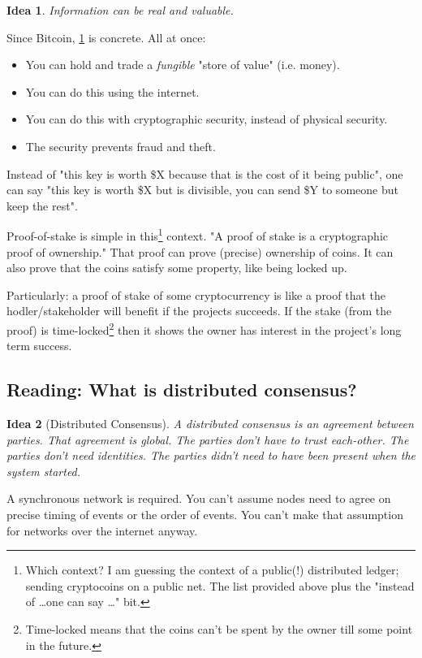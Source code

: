 \documentclass{article}
\newtheorem{idea}{Idea}
\begin{document}
\begin{idea} \label{def:inforeal}
    Information can be real and valuable.
\end{idea}

Since Bitcoin, \cref{def:inforeal} is concrete.
All at once:
\begin{itemize}
    \item You can hold and trade a \emph{fungible} "store of value" (i.e. money).
    \item You can do this using the internet.
    \item You can do this with cryptographic security, instead of physical security.
    \item The security prevents fraud and theft.
\end{itemize}
Instead of "this key is worth \$X because that is the cost of it being public", one can say "this key is worth \$X but is divisible, you can send \$Y to someone but keep the rest".

Proof-of-stake is simple in this\footnote{Which context? I am guessing the context of a public(!) distributed ledger; sending cryptocoins on a public net. The list provided above plus the "instead of \dots one can say \dots" bit.} context. "A proof of stake is a cryptographic proof of ownership."
That proof can prove (precise) ownership of coins. It can also prove that the coins satisfy some property, like being locked up.

Particularly: a proof of stake of some cryptocurrency is like a proof that the hodler/stakeholder will benefit if the projects succeeds. If the stake (from the proof) is time-locked\footnote{Time-locked means that the coins can't be spent by the owner till some point in the future.} then it shows the owner has interest in the project's long term success.

\subsection{Reading: What is distributed consensus?}

\begin{idea}[Distributed Consensus]
    A \emph{distributed consensus} is an agreement between parties. That agreement is global. The parties don't have to trust each-other. The parties don't need identities. The parties didn't need to have been present when the system started.
\end{idea}

A synchronous network is required. You can't assume nodes need to agree on precise timing of events or the order of events. You can't make that assumption for networks over the internet anyway.
\end{document}
